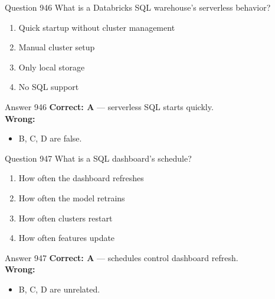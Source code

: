 \documentclass[aspectratio=169,11pt]{beamer}
\begin{document}
	\begin{frame}{Question 946}
		What is a Databricks SQL warehouse's serverless behavior?
		\begin{enumerate}[label=\Alph*.]
			\item Quick startup without cluster management
			\item Manual cluster setup
			\item Only local storage
			\item No SQL support
		\end{enumerate}
	\end{frame}
	\begin{frame}{Answer 946}
		\textbf{Correct: A} --- serverless SQL starts quickly.\\
		\vspace{0.5em}
		\textbf{Wrong:}
		\begin{itemize}
			\item B, C, D are false.
		\end{itemize}
	\end{frame}
	
	\begin{frame}{Question 947}
		What is a SQL dashboard's schedule?
		\begin{enumerate}[label=\Alph*.]
			\item How often the dashboard refreshes
			\item How often the model retrains
			\item How often clusters restart
			\item How often features update
		\end{enumerate}
	\end{frame}
	\begin{frame}{Answer 947}
		\textbf{Correct: A} --- schedules control dashboard refresh.\\
		\vspace{0.5em}
		\textbf{Wrong:}
		\begin{itemize}
			\item B, C, D are unrelated.
		\end{itemize}
	\end{frame}
	
\end{document}
